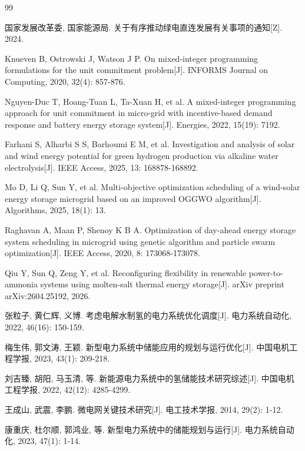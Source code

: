 \documentclass[a4paper]{neepumcm}
\begin{document}
\begin{thebibliography}{99}

 国家发展改革委, 国家能源局. 关于有序推动绿电直连发展有关事项的通知[Z]. 2024.

 Knueven B, Ostrowski J, Watson J P. On mixed-integer programming formulations for the unit commitment problem[J]. INFORMS Journal on Computing, 2020, 32(4): 857-876.

 Nguyen-Duc T, Hoang-Tuan L, Ta-Xuan H, et al. A mixed-integer programming approach for unit commitment in micro-grid with incentive-based demand response and battery energy storage system[J]. Energies, 2022, 15(19): 7192.

 Farhani S, Alharbi S S, Barhoumi E M, et al. Investigation and analysis of solar and wind energy potential for green hydrogen production via alkaline water electrolysis[J]. IEEE Access, 2025, 13: 168878-168892.

 Mo D, Li Q, Sun Y, et al. Multi-objective optimization scheduling of a wind-solar energy storage microgrid based on an improved OGGWO algorithm[J]. Algorithms, 2025, 18(1): 13.

 Raghavan A, Maan P, Shenoy K B A. Optimization of day-ahead energy storage system scheduling in microgrid using genetic algorithm and particle swarm optimization[J]. IEEE Access, 2020, 8: 173068-173078.

 Qiu Y, Sun Q, Zeng Y, et al. Reconfiguring flexibility in renewable power-to-ammonia systems using molten-salt thermal energy storage[J]. arXiv preprint arXiv:2604.25192, 2026.

 张粒子, 黄仁辉, 义博. 考虑电解水制氢的电力系统优化调度[J]. 电力系统自动化, 2022, 46(16): 150-159.

 梅生伟, 郭文涛, 王颖. 新型电力系统中储能应用的规划与运行优化[J]. 中国电机工程学报, 2023, 43(1): 209-218.

 刘吉臻, 胡阳, 马玉清, 等. 新能源电力系统中的氢储能技术研究综述[J]. 中国电机工程学报, 2022, 42(12): 4285-4299.

 王成山, 武震, 李鹏. 微电网关键技术研究[J]. 电工技术学报, 2014, 29(2): 1-12.

 康重庆, 杜尔顺, 郭鸿业, 等. 新型电力系统中的储能规划与运行[J]. 电力系统自动化, 2023, 47(1): 1-14.

\end{thebibliography}

\begin{appendices}

\end{appendices}
\end{document}
